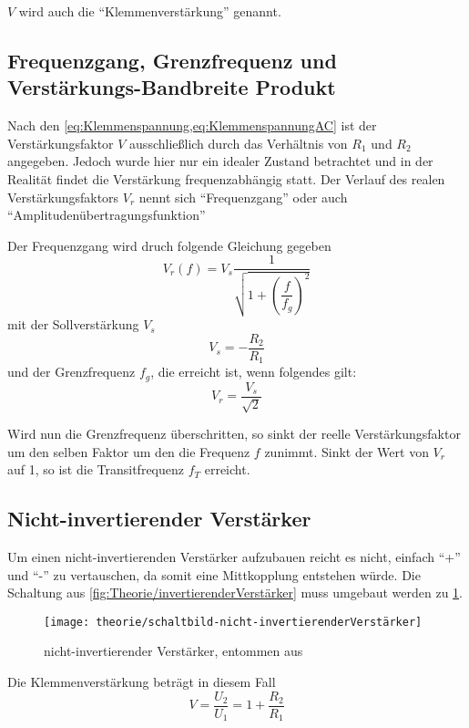 $V$ wird auch die "`Klemmenverstärkung"' genannt.
\newpage
\subsection{Frequenzgang, Grenzfrequenz und Verstärkungs-Bandbreite Produkt}
Nach den \cref{eq:Klemmenspannung,eq:KlemmenspannungAC} ist der 
Verstärkungsfaktor $V$ ausschließlich durch das Verhältnis von $R_1$ und $R_2$
angegeben. Jedoch wurde hier nur ein idealer Zustand betrachtet und in der 
Realität findet die Verstärkung frequenzabhängig statt. Der Verlauf des
realen Verstärkungsfaktors $V_r$ nennt sich "`Frequenzgang"' oder auch
"`Amplitudenübertragungsfunktion"'

Der Frequenzgang wird druch folgende Gleichung gegeben
\begin{equation}\label{eq:Frequenzgang}
	V_r(f) = V_s \dfrac{1}{
		\sqrt{1 + \left(
			\dfrac{f}{f_g}
		\right)^2}
	}
\end{equation}
mit der Sollverstärkung $V_s$
\begin{equation}\label{eq:Sollverstärkung}
	V_s = - \dfrac{R_2}{R_1}
\end{equation}
und der Grenzfrequenz $f_g$, die erreicht ist, wenn folgendes gilt:
\begin{equation}
	V_r = \dfrac{V_s}{\sqrt{2}}
\end{equation}

Wird nun die Grenzfrequenz überschritten, so sinkt der reelle Verstärkungsfaktor
um den selben Faktor um den die Frequenz $f$ zunimmt. Sinkt der Wert von $V_r$
auf 1, so ist die Transitfrequenz $f_T$ erreicht.

\subsection{Nicht-invertierender Verstärker}
Um einen nicht-invertierenden Verstärker aufzubauen reicht es nicht, einfach
"`+"' und "`-"' zu vertauschen, da somit eine Mittkopplung entstehen würde. Die
Schaltung aus \cref{fig:Theorie/invertierenderVerstärker} muss umgebaut werden
zu \cref{fig:Theorie/nicht-invertierenderVerstärker}.
\begin{figure}[H]
	\centering
	\texttt{[image: theorie/schaltbild-nicht-invertierenderVerstärker]}
	\caption{nicht-invertierender Verstärker, entommen
	aus \cite{script}}
	\label{fig:Theorie/nicht-invertierenderVerstärker}
\end{figure}

Die Klemmenverstärkung beträgt in diesem Fall
\begin{equation}
	V = \dfrac{U_2}{U_1} = 1 + \dfrac{R_2}{R_1}
\end{equation}

